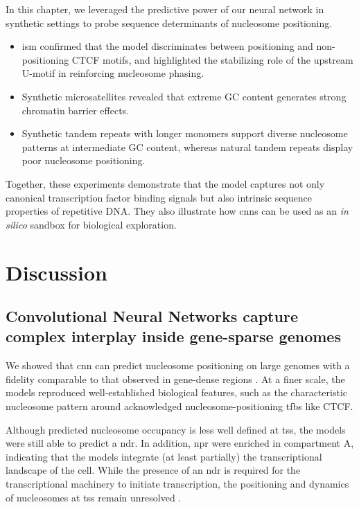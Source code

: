 \documentclass[11pt]{book}
\begin{document}
\FloatBarrier
\begin{tcolorbox}[title=Chapter summary, colframe=pink, colback=pink!10!white, coltitle=black, breakable, fonttitle=\bfseries]
    In this chapter, we leveraged the predictive power of our neural network in synthetic settings to probe sequence determinants of nucleosome positioning.  

    \begin{itemize}
        \item \gls{ism} confirmed that the model discriminates between positioning and non-positioning CTCF motifs, and highlighted the stabilizing role of the upstream U-motif in reinforcing nucleosome phasing.
        \item Synthetic microsatellites revealed that extreme GC content generates strong chromatin barrier effects.
        \item Synthetic tandem repeats with longer monomers support diverse nucleosome patterns at intermediate GC content, whereas natural tandem repeats display poor nucleosome positioning.
    \end{itemize}

    Together, these experiments demonstrate that the model captures not only canonical transcription factor binding signals but also intrinsic sequence properties of repetitive DNA. They also illustrate how \glspl{cnn} can be used as an \textit{in silico} sandbox for biological exploration.
\end{tcolorbox}



\FloatBarrier
\chapter{Discussion}

\section{Convolutional Neural Networks capture complex interplay inside gene-sparse genomes}
We showed that \gls{cnn} can predict nucleosome positioning on large genomes with a fidelity comparable to that observed in gene-dense regions \cite{routhier_genome-wide_2021}. At a finer scale, the models reproduced well-established biological features, such as the characteristic nucleosome pattern around acknowledged nucleosome-positioning \gls{tfbs} like CTCF.

Although predicted nucleosome occupancy is less well defined at \gls{tss}, the models were still able to predict a \gls{ndr}. In addition, \gls{npr} were enriched in compartment A, indicating that the models integrate (at least partially) the transcriptional landscape of the cell. While the presence of an \gls{ndr} is required for the transcriptional machinery to initiate transcription, the positioning and dynamics of nucleosomes at \gls{tss} remain unresolved \cite{small_single-cell_2014, chereji_major_2018, wang_dynamic_2022}.
\end{document}
